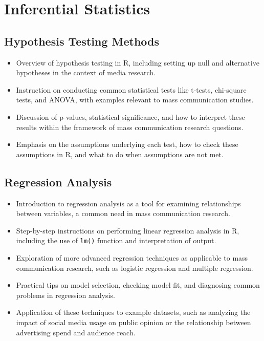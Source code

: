 \documentclass[
]{book}
\begin{document}
\hypertarget{inferential-statistics}{%
\section*{Inferential Statistics}\label{inferential-statistics}}

\hypertarget{hypothesis-testing-methods}{%
\subsection*{Hypothesis Testing Methods}\label{hypothesis-testing-methods}}

\begin{itemize}
\item
  Overview of hypothesis testing in R, including setting up null and alternative hypotheses in the context of media research.
\item
  Instruction on conducting common statistical tests like t-tests, chi-square tests, and ANOVA, with examples relevant to mass communication studies.
\item
  Discussion of p-values, statistical significance, and how to interpret these results within the framework of mass communication research questions.
\item
  Emphasis on the assumptions underlying each test, how to check these assumptions in R, and what to do when assumptions are not met.
\end{itemize}

\hypertarget{regression-analysis}{%
\subsection*{Regression Analysis}\label{regression-analysis}}

\begin{itemize}
\item
  Introduction to regression analysis as a tool for examining relationships between variables, a common need in mass communication research.
\item
  Step-by-step instructions on performing linear regression analysis in R, including the use of \texttt{lm()} function and interpretation of output.
\item
  Exploration of more advanced regression techniques as applicable to mass communication research, such as logistic regression and multiple regression.
\item
  Practical tips on model selection, checking model fit, and diagnosing common problems in regression analysis.
\item
  Application of these techniques to example datasets, such as analyzing the impact of social media usage on public opinion or the relationship between advertising spend and audience reach.
\end{itemize}
\end{document}
